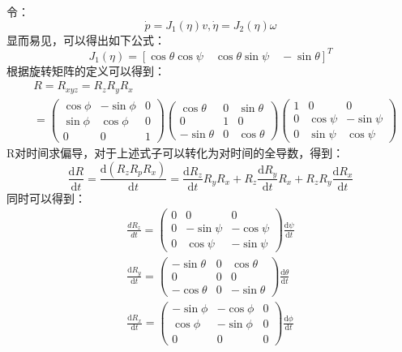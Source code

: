 令：
\begin{equation}
    \dot{p}=J_1(\eta)v,\dot{\eta}=J_2(\eta)\omega 
\end{equation}
显而易见，可以得出如下公式：
\begin{equation}
    J_{1}(\eta)=[\cos\theta\cos\psi\quad\cos\theta\sin\psi\quad-\sin\theta]^{T}
\end{equation}
根据旋转矩阵的定义可以得到：
\begin{equation}
    \begin{aligned}
&R=R_{xyz}=R_zR_yR_x \\
&=\begin{pmatrix}\cos\phi&-\sin\phi&0\\\sin\phi&\cos\phi&0\\0&0&1\end{pmatrix}\begin{pmatrix}\cos\theta&0&\sin\theta\\0&1&0\\-\sin\theta&0&\cos\theta\end{pmatrix}\begin{pmatrix}1&0&0\\0&\cos\psi&-\sin\psi\\0&\sin\psi&\cos\psi\end{pmatrix}
\end{aligned}
\end{equation}
R对时间求偏导，对于上述式子可以转化为对时间的全导数，得到：
\begin{equation}
    \frac{\mathrm{d}R}{\mathrm{d}t}=\frac{\mathrm{d}\left(R_zR_pR_x\right)}{\mathrm{d}t}=\frac{\mathrm{d}R_z}{\mathrm{d}t}R_yR_x+R_z\frac{\mathrm{d}R_y}{\mathrm{d}t}R_x+R_zR_y\frac{\mathrm{d}R_x}{\mathrm{d}t}
\end{equation}
同时可以得到：
\begin{equation}
    \begin{gathered}
\frac{dR_z}{dt} =\begin{pmatrix}0&0&0\\0&-\sin \psi&-\cos \psi\\0&\cos \psi&-\sin \psi\end{pmatrix}\frac{\mathrm{d}\psi}{\mathrm{d}t} \\
\frac{\mathrm{d}R_y}{\mathrm{d}t} =\begin{pmatrix}-\sin \theta&0&\cos \theta\\0&0&0\\-\cos \theta&0&-\sin \theta\end{pmatrix}\frac{\mathrm{d}\theta}{\mathrm{d}t} \\
\frac{\mathrm{d}R_x}{\mathrm{d}t} =\begin{pmatrix}-\sin \phi&-\cos \phi&0\\\cos \phi&-\sin \phi&0\\0&0&0\end{pmatrix}\frac{\mathrm{d}\phi}{\mathrm{d}t} 
\end{gathered}
\end{equation}

